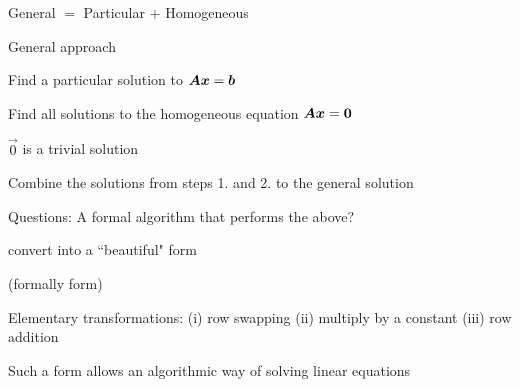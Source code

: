 \documentclass[fleqn,aspectratio=169]{beamer}
\begin{document}
\begin{frame}{General $=$ Particular $+$ Homogeneous} 

\bci
\item General approach
\bce
\item Find a particular solution to $\bm{A} \bm{x} = \bm{b}$
\item Find all solutions to the homogeneous equation $\bm{A} \bm{x} = \bm{0}$
\bci
\item $\vec{0}$ is a trivial solution 
\eci
\item Combine the solutions from steps 1. and 2. to the general solution
\ece

\item Questions: A formal algorithm that performs the above?
\bci
\item {} convert into a ``beautiful" form 

(formally  form)

\item Elementary transformations: (i) row swapping (ii) multiply by a constant (iii) row addition
\eci

\item Such a form allows an algorithmic way of solving linear equations

\eci
\end{frame}
\end{document}

